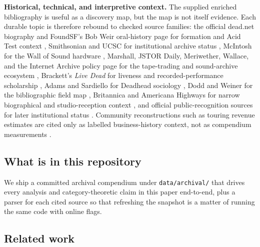 \documentclass[
]{article}
\begin{document}
\textbf{Historical, technical, and interpretive context.} The supplied
enriched bibliography is useful as a discovery map, but the map is not
itself evidence. Each durable topic is therefore rebound to checked
source families: the official dead.net biography and FoundSF's Bob Weir
oral-history page for formation and Acid Test context
\citep{dead_net_biography, foundsf_weir_psychedelic_sf}, Smithsonian and
UCSC for institutional archive status
\citep{smithsonian_institutionally_dead, ucsc_grateful_dead_archive},
McIntosh for the Wall of Sound hardware \citep{mcintosh_wall_of_sound},
Marshall, JSTOR Daily, Meriwether, Wallace, and the Internet Archive
policy page for the tape-trading and sound-archive ecosystem
\citep{marshall_bootleg_collectors, jstor_daily_tape_trading, dead_net_taping_dead, wallace_cocreation_sound_archive, internet_archive_gd_collection_policy},
Brackett's \emph{Live Dead} for liveness and recorded-performance
scholarship \citep{brackett_live_dead}, Adams and Sardiello for Deadhead
sociology \citep{adams_deadhead_social_science}, Dodd and Weiner for the
bibliographic field map \citep{dodd_weiner_annotated_bibliography},
Britannica and Americana Highways for narrow biographical and
studio-reception context
\citep{britannica_jerry_garcia, americana_highways_workingmans_american_beauty},
and official public-recognition sources for later institutional status
\citep{rockhall_grateful_dead, grammy_lifetime_achievement, kennedy_center_honors_2024}.
Community reconstructions such as touring revenue estimates are cited
only as labelled business-history context, not as compendium
measurements \citep{grateful_seconds_touring_revenues}.

\subsection{What is in this
repository}\label{what-is-in-this-repository}

We ship a committed archival compendium under \texttt{data/archival/}
that drives every analysis and category-theoretic claim in this paper
end-to-end, plus a parser for each cited source so that refreshing the
snapshot is a matter of running the same code with online flags.

\subsection{Related work}\label{related-work}
\end{document}
